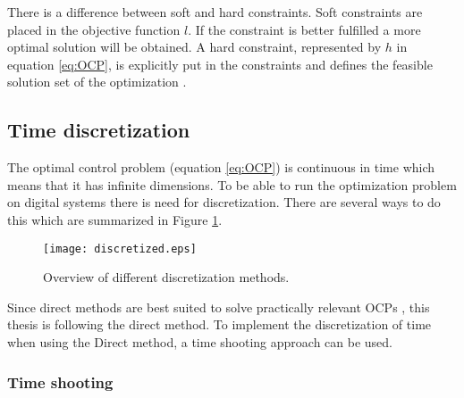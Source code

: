 There is a difference between soft and hard constraints. Soft constraints are placed in the objective function $l$. If the constraint is better fulfilled a more optimal solution will be obtained. A hard constraint, represented by $h$ in equation \ref{eq:OCP}, is explicitly put in the constraints and defines the feasible solution set of the optimization \cite{Yankov}.\\

\subsection{Time discretization}\label{s:time_dis}

The optimal control problem (equation \ref{eq:OCP}) is continuous in time which means that it has infinite dimensions. To be able to run the optimization problem on digital systems there is need for discretization. There are several ways to do this which are summarized in Figure \ref{fig:discretization_m}.
\begin{figure}[htp]
	\centering
	\texttt{[image: discretized.eps]}
	\caption{Overview of different discretization methods.}
	\label{fig:discretization_m}
\end{figure}

Since direct methods are best suited to solve practically relevant OCPs \cite{Mercy2018}, this thesis is following the direct method. To implement the discretization of time when using the Direct method, a time shooting approach can be used.

\subsubsection*{Time shooting}

